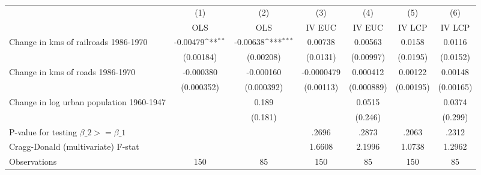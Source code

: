 {
\def\sym#1{\ifmmode^{#1}\else\(^{#1}\)\fi}
\begin{tabular}{l*{6}{c}}
\hline\hline
                &\multicolumn{1}{c}{(1)}&\multicolumn{1}{c}{(2)}&\multicolumn{1}{c}{(3)}&\multicolumn{1}{c}{(4)}&\multicolumn{1}{c}{(5)}&\multicolumn{1}{c}{(6)}\\
                &\multicolumn{1}{c}{OLS}&\multicolumn{1}{c}{OLS}&\multicolumn{1}{c}{IV EUC}&\multicolumn{1}{c}{IV EUC}&\multicolumn{1}{c}{IV LCP}&\multicolumn{1}{c}{IV LCP}\\
\hline
Change in kms of railroads 1986-1970& -0.00479\sym{**} & -0.00638\sym{***}&  0.00738         &  0.00563         &   0.0158         &   0.0116         \\
                &(0.00184)         &(0.00208)         & (0.0131)         &(0.00997)         & (0.0195)         & (0.0152)         \\
[1em]
Change in kms of roads 1986-1970&-0.000380         &-0.000160         &-0.0000479         & 0.000412         &  0.00122         &  0.00148         \\
                &(0.000352)         &(0.000392)         &(0.00113)         &(0.000889)         &(0.00195)         &(0.00165)         \\
[1em]
Change in log urban population 1960-1947&                  &    0.189         &                  &   0.0515         &                  &   0.0374         \\
                &                  &  (0.181)         &                  &  (0.246)         &                  &  (0.299)         \\
\hline
P-value for testing $\beta\_{2} >= \beta\_{1}$&                  &                  &    .2696         &    .2873         &    .2063         &    .2312         \\
Cragg-Donald (multivariate) F-stat&                  &                  &   1.6608         &   2.1996         &   1.0738         &   1.2962         \\
Observations    &      150         &       85         &      150         &       85         &      150         &       85         \\
\hline\hline
\end{tabular}
}
